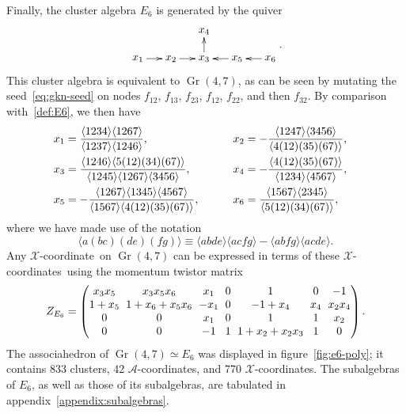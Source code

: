\documentclass[12pt]{article}
\DeclareMathOperator{\Gr}{Gr}
\def\ket#1{\langle #1 \rangle}
\def\xcoord{$\mathcal{X}$-coordinate}
\def\xcoords{$\mathcal{X}$-coordinates}
\def\acoords{$\mathcal{A}$-coordinates}
\begin{document}
Finally, the cluster algebra $E_6$ is generated by the quiver
\begin{equation}\label{def:E6}
    \begin{gathered}
    \begin{xy} 0;<1pt,0pt>:<0pt,-1pt>::
      (0,0) *+{x_1} ="1",
      (30,0) *+{x_2} ="2",
      (60,0) *+{x_3} ="3",
      (60,-25) *+{x_4} ="4",
      (90,0) *+{x_5} ="5",
      (120,0) *+{x_6} ="6",
      "1", {\ar"2"},
      "2", {\ar"3"},
      "3", {\ar"4"},
      "5", {\ar"3"},
      "6", {\ar"5"},
    \end{xy}
    \end{gathered} .
\end{equation}
This cluster algebra is equivalent to $\Gr(4,7)$, as can be seen by mutating the seed~\eqref{eq:gkn-seed} on nodes $f_{12}$, $f_{13}$, $f_{23}$, $f_{12}$, $f_{22}$, and then $f_{32}$. By comparison with~\eqref{def:E6}, we then have 
\begin{align} \label{eq:E6_x_def}
x_1 &= \frac{\ket{1234}\ket{1267}}{\ket{1237} \ket{1246}}, \hspace{13.03ex} \quad \quad 
x_2 = - \frac{\ket{1247} \ket{3456}}{\ket{4(12)(35)(67)}}, \quad \nonumber \\
x_3 &= \frac{\ket{1246} \ket{5(12)(34)(67)}}{\ket{1245} \ket{1267} \ket{3456}}, \hspace{4.12ex} \quad \quad 
x_4 = -\frac{\ket{4(12)(35)(67)}}{\ket{1234} \ket{4567}}, \quad \\
x_5 &= -\frac{\ket{1267} \ket{1345}\ket{4567}}{\ket{1567}\ket{4(12)(35)(67)}}, \quad \quad \quad 
x_6 = \frac{\ket{1567}\ket{2345}}{\ket{5(12)(34)(67)}}, \quad \nonumber
\end{align}
where we have made use of the notation
\begin{equation} \label{eq:twistor_intersection}
\ket{a(bc)(de)(fg)} \equiv \ket{abde}\ket{acfg}-\ket{abfg}\ket{acde}.
\end{equation}
Any \xcoord\ on $\Gr(4,7)$ can be expressed in terms of these \xcoords\ using the momentum twistor matrix 
\begin{equation}
Z_{E_6} = 
\begingroup
\setlength\arraycolsep{3pt}
\begin{pmatrix} 
 x_3 x_5 & x_3 x_5 x_6 & x_1 & 0 & 1 & 0 & -1 \\
 1+x_5 & 1 + x_6 + x_5 x_6 & -x_1 & 0 & -1+x_4 & x_4 & x_2 x_4 \\
 0 & 0 & x_1 & 0 & 1 & 1 & x_2 \\
 0 & 0 & -1 & 1 & 1+x_2+x_2 x_3 & 1 & 0 \\
\end{pmatrix} .
\endgroup
\end{equation}
The associahedron of $\Gr(4,7) \simeq E_6$ was displayed in figure~\ref{fig:e6-poly}; it contains 833 clusters, 42 \acoords, and 770 \xcoords. The subalgebras of $E_6$, as well as those of its subalgebras, are tabulated in appendix~\ref{appendix:subalgebras}.
\end{document}
